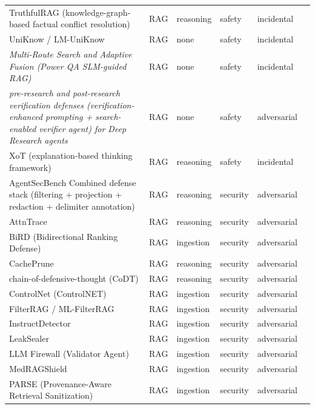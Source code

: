 \begin{longtable}{@{}p{}lllll@{}}
TruthfulRAG (knowledge-graph-based factual conflict resolution) & RAG & reasoning & safety & incidental & \cite{liu-2026-truthfulrag} \\
UniKnow / LM-UniKnow & RAG & none & safety & incidental & \cite{kim-2025-uniknow} \\
\emph{Multi-Route Search and Adaptive Fusion (Power QA SLM-guided RAG)} & RAG & none & safety & incidental & \cite{shen-2026-multiroute} \\
\emph{pre-research and post-research verification defenses (verification-enhanced prompting + search-enabled verifier agent) for Deep Research agents} & RAG & none & safety & adversarial & \cite{zhu-2026-deep} \\
XoT (explanation-based thinking framework) & RAG & reasoning & safety & incidental & \cite{zhao-2026-exploring} \\
AgentSecBench Combined defense stack (filtering + projection + redaction + delimiter annotation) & RAG & reasoning & security & adversarial & \cite{alpay-2026-agentsecbench} \\
AttnTrace & RAG & reasoning & security & adversarial & \cite{wang-2025-attntrace} \\
BiRD (Bidirectional Ranking Defense) & RAG & ingestion & security & adversarial & \cite{gao-2026-bird} \\
CachePrune & RAG & reasoning & security & adversarial & \cite{wang-2025-cacheprune} \\
chain-of-defensive-thought (CoDT) & RAG & reasoning & security & adversarial & \cite{wang-2025-chainofdefensivethought} \\
ControlNet (ControlNET) & RAG & ingestion & security & adversarial & \cite{yao-2025-controlnet} \\
FilterRAG / ML-FilterRAG & RAG & ingestion & security & adversarial & \cite{edemacu-2025-defending} \\
InstructDetector & RAG & ingestion & security & adversarial & \cite{wen-2025-defending} \\
LeakSealer & RAG & ingestion & security & adversarial & \cite{panebianco-2025-leaksealer} \\
LLM Firewall (Validator Agent) & RAG & ingestion & security & adversarial & \cite{podpora-2025-llm} \\
MedRAGShield & RAG & ingestion & security & adversarial & \cite{shanid-2026-medragshield} \\
PARSE (Provenance-Aware Retrieval Sanitization) & RAG & ingestion & security & adversarial & \cite{pai-2026-parse} \\

\end{longtable}
